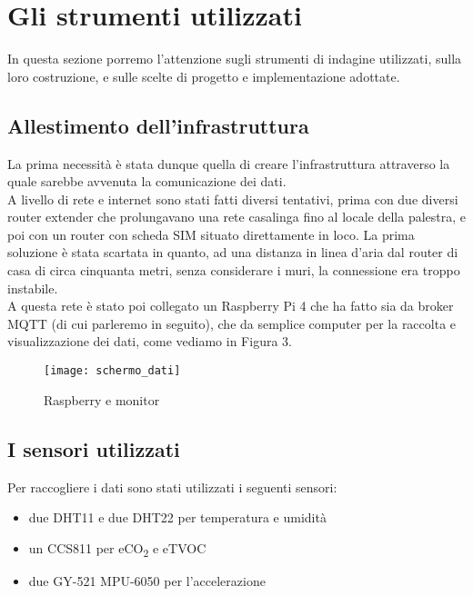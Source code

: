 \documentclass[fleqn,10pt]{SelfArx} %
\begin{document}

\section{Gli strumenti utilizzati}

In questa sezione porremo l'attenzione sugli strumenti di indagine utilizzati, sulla loro costruzione, e sulle 
scelte di progetto e implementazione adottate.

\subsection{Allestimento dell'infrastruttura}

La prima necessità è stata dunque quella di creare l'infrastruttura attraverso la quale sarebbe avvenuta la 
comunicazione dei dati.\\
A livello di rete e internet sono stati fatti diversi tentativi, prima con due diversi router extender che 
prolungavano una rete casalinga fino al locale della palestra, e poi con un router con scheda SIM 
situato direttamente in loco. La prima soluzione è stata scartata in quanto, ad una distanza in linea d'aria 
dal router di casa di circa cinquanta metri, senza considerare i muri, la connessione era troppo instabile.\\

A questa rete è stato poi collegato un Raspberry Pi 4 che ha fatto sia da broker MQTT (di cui parleremo in seguito), 
che da semplice computer per la raccolta e visualizzazione dei dati, come vediamo in Figura 3.

\begin{figure}[htb!]\centering
	\texttt{[image: schermo\_dati]}
	\caption{Raspberry e monitor}
	\label{fig:schermo}
\end{figure}

\subsection{I sensori utilizzati}

Per raccogliere i dati sono stati utilizzati i seguenti sensori:

\begin{itemize}[noitemsep] %
	\item due DHT11 e due DHT22 per temperatura e umidità
	\item un CCS811 per eCO\textsubscript{2} e eTVOC
	\item due GY-521 MPU-6050 per l'accelerazione
\end{itemize}
\end{document}
